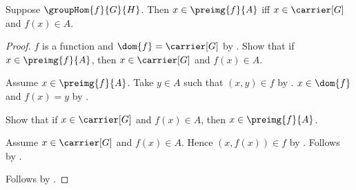 \begin{proposition}\label{group_hom_preimage_iff}
    Suppose $\groupHom{f}{G}{H}$.
    Then $x\in\preimg{f}{A}$ iff
        $x\in\carrier[G]$ and $f(x)\in A$.
\end{proposition}
\begin{proof}
    $f$ is a function and $\dom{f}=\carrier[G]$ by
        .
    Show that if $x\in\preimg{f}{A}$, then
        $x\in\carrier[G]$ and $f(x)\in A$.
    \begin{subproof}
        Assume $x\in\preimg{f}{A}$.
        Take $y\in A$ such that $(x,y)\in f$ by
            .
        $x\in\dom{f}$ and $f(x)=y$ by
            .
    \end{subproof}
    Show that if $x\in\carrier[G]$ and $f(x)\in A$, then
        $x\in\preimg{f}{A}$.
    \begin{subproof}
        Assume $x\in\carrier[G]$ and $f(x)\in A$.
        Hence $(x,f(x))\in f$ by .
        Follows by .
    \end{subproof}
    Follows by \auto.
\end{proof}

